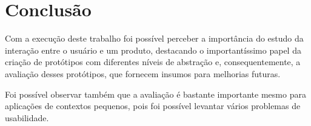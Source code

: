 \chapter{Conclusão}

  Com a execução deste trabalho foi possível perceber a importância do estudo da interação entre o usuário e um produto,
  destacando o importantíssimo papel da criação de protótipos com diferentes níveis de abstração e, consequentemente, a 
  avaliação desses protótipos, que fornecem insumos para melhorias futuras.
  
  Foi possível observar também que a avaliação é bastante importante mesmo para aplicações de contextos pequenos,
  pois foi possível levantar vários problemas de usabilidade.